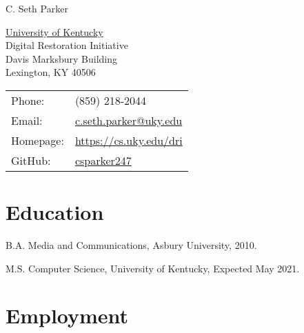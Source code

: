 \documentclass[letterpaper]{article}
\def\name{C. Seth Parker}
\renewenvironment{itemize}{
  \begin{list}{}{
    \setlength{\leftmargin}{1.5em}
  }
}{
  \end{list}
}
\begin{document}
{\huge \name}


\vspace{0.25in}

\begin{minipage}{0.45\linewidth}
  \href{http://www.unc.edu/}{University of Kentucky} \\
  Digital Restoration Initiative \\
  Davis Marksbury Building \\
  Lexington, KY 40506
\end{minipage}
\begin{minipage}{0.45\linewidth}
  \begin{tabular}{ll}
    Phone: & (859) 218-2044 \\
    Email: & \href{mailto:c.seth.parker@uky.edu}{c.seth.parker@uky.edu} \\
    Homepage: & \href{https://cs.uky.edu/dri}{https://cs.uky.edu/dri} \\
    GitHub: & \href{https://github.com/csparker247}{csparker247} \\
  \end{tabular}
\end{minipage}


%


\section*{Education}

\begin{itemize}
  \item B.A. Media and Communications, Asbury University, 2010.

  \item M.S. Computer Science, University of Kentucky, Expected May 2021.
\end{itemize}


\section*{Employment}
\end{document}
